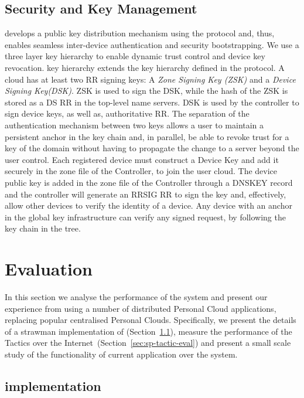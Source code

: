 \subsection{Security and Key Management} \label{signpost-security}

\signpost develops a public key distribution mechanism using the \dnssec protocol 
and, thus, enables seamless inter-device
authentication and security bootstrapping.  We use a three layer key
hierarchy to enable dynamic trust control and device key revocation.
\signpost key hierarchy extends the key hierarchy defined in the \dnssec
protocol. A \signpost cloud has at least two RR signing keys: A {\it Zone
  Signing Key (ZSK)} and a {\it Device Signing Key(DSK)}. ZSK is used to sign
the DSK, while the hash of the ZSK is stored as a DS RR in the top-level name
servers. DSK is used by the controller to sign device keys, as well as,
authoritative RR. The separation of the authentication mechanism between two
keys allows a user to maintain a persistent anchor in the \dnssec key chain and,
in parallel, be able to revoke trust for a key of the domain without having to
propagate the change to a server beyond the user control.  Each registered
\signpost device must construct a Device Key and add it securely in the zone
file of the Controller, to join the user cloud. The device
public key is added in the zone file of the Controller through a DNSKEY record
and the controller will generate an RRSIG RR to sign the key and, effectively, allow other devices to
verify the identity of a device. Any device with an anchor in the global \dnssec
key infrastructure can verify any \signpost signed request, by following the
key chain in the \dnssec tree.

\section{Evaluation}\label{sec:signpost-evaluation}

In this section we analyse the performance of the \signpost system and present
our experience from using a number of distributed Personal Cloud applications,
replacing popular centralised Personal Clouds. Specifically, we present the
details of a strawman implementation of \signpost
(Section~\ref{sec:sp-implementation}), measure the performance of the \signpost
Tactics over the Internet~(Section~\ref{sec:sp-tactic-eval}) and present a small
scale study of the functionality of current application over the \signpost
system. 

\subsection{\signpost implementation} \label{sec:sp-implementation}


